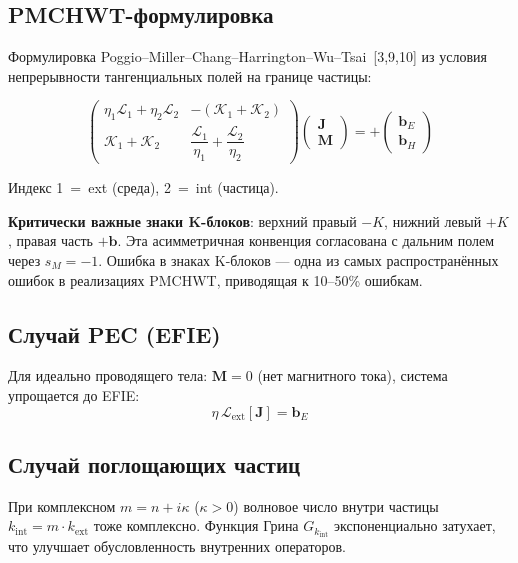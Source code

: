 \documentclass[12pt,a4paper]{article}
\begin{document}
\subsection{PMCHWT-формулировка}

Формулировка Poggio--Miller--Chang--Harrington--Wu--Tsai~[3,9,10] из условия непрерывности тангенциальных полей на границе частицы:

\begin{equation}
\boxed{
\begin{pmatrix}
  \eta_1 \mathcal{L}_1 + \eta_2 \mathcal{L}_2 & -(\mathcal{K}_1 + \mathcal{K}_2) \\[0.5em]
  \mathcal{K}_1 + \mathcal{K}_2 & \dfrac{\mathcal{L}_1}{\eta_1} + \dfrac{\mathcal{L}_2}{\eta_2}
\end{pmatrix}
\begin{pmatrix}
  \mathbf{J} \\ \mathbf{M}
\end{pmatrix}
= +
\begin{pmatrix}
  \mathbf{b}_E \\[0.5em]
  \mathbf{b}_H
\end{pmatrix}
}
\end{equation}

Индекс 1~=~ext (среда), 2~=~int (частица).

\textbf{Критически важные знаки K-блоков}: верхний правый $-K$, нижний левый $+K$, правая часть $+\mathbf{b}$. Эта асимметричная конвенция согласована с дальним полем через $s_M = -1$. Ошибка в знаках K-блоков --- одна из самых распространённых ошибок в реализациях PMCHWT, приводящая к 10--50\% ошибкам.

\subsection{Случай PEC (EFIE)}

Для идеально проводящего тела: $\mathbf{M} = 0$ (нет магнитного тока), система упрощается до EFIE:
\begin{equation}
  \eta \, \mathcal{L}_{\mathrm{ext}}[\mathbf{J}] = \mathbf{b}_E
\end{equation}

\subsection{Случай поглощающих частиц}

При комплексном $m = n + i\kappa$ ($\kappa > 0$) волновое число внутри частицы $k_{\mathrm{int}} = m \cdot k_{\mathrm{ext}}$ тоже комплексно. Функция Грина $G_{k_{\mathrm{int}}}$ экспоненциально затухает, что улучшает обусловленность внутренних операторов.
\end{document}
